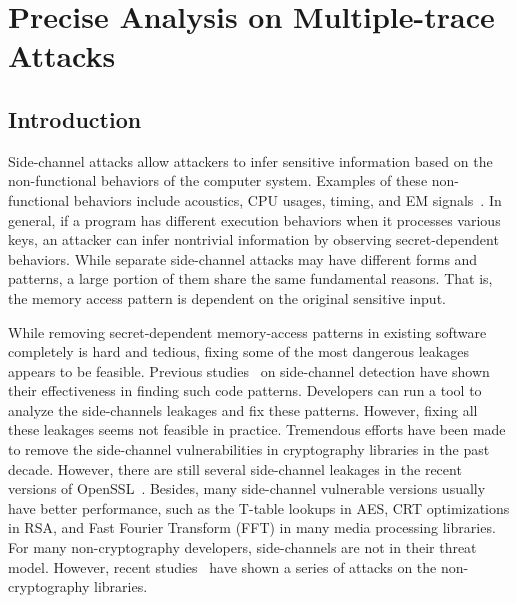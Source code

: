 
\chapter{Precise Analysis on Multiple-trace Attacks}\label{chapter5}
\section{Introduction}
Side-channel attacks allow attackers to infer sensitive information based on the non-functional behaviors of the computer system. Examples of these non-functional behaviors include acoustics, CPU usages, timing, and EM signals~\cite{agrawal2002side,hund2013practical,halevi2015keyboard,batina2019csi}. In general, if a program has different execution behaviors when it processes various keys, an attacker can infer nontrivial information by observing secret-dependent behaviors. While separate side-channel attacks may have different forms and patterns, a large portion of them share the same fundamental reasons. That is, the memory access pattern is dependent on the original sensitive input.

While removing secret-dependent memory-access patterns in existing software completely is hard and tedious, fixing some of the most dangerous leakages appears to be feasible. Previous studies~\cite{182946,203878,182946,236338,217537,langley2010ctgrind,xiao2017stacco,wang2019time,Wichelmann:2018:MFF:3274694.3274741,bao2021abacus} on side-channel detection have shown their effectiveness in finding such code patterns. Developers can run a tool to analyze the side-channels leakages and fix these patterns. However, fixing all
these leakages seems not feasible in practice.  Tremendous efforts have been made to remove the side-channel vulnerabilities in cryptography
libraries in the past decade. However,  there are
still several side-channel leakages in the recent versions of OpenSSL~\cite{OpenSSL-1.1.1-note}. Besides, many side-channel vulnerable versions usually
have better performance, such as the T-table lookups in AES, CRT
optimizations in RSA, and Fast Fourier Transform (FFT) in many media processing libraries. For many non-cryptography developers, side-channels are not in their threat model. However, recent studies~\cite{xu2015controlled,191010,hahnel2017high} have shown a series of attacks on the non-cryptography libraries.


